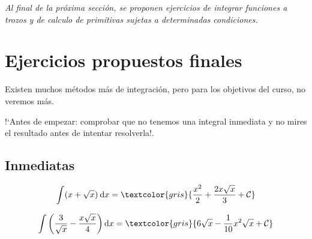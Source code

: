 {\emph{Al final de la próxima sección, se proponen ejercicios de integrar funciones a trozos y de calculo de primitivas sujetas a determinadas condiciones.}



\section{Ejercicios propuestos finales}

Existen muchos métodos más de integración, pero para los objetivos del curso, no veremos más.

!`Antes de empezar: comprobar que no tenemos una integral inmediata y no mires el resultado antes de intentar resolverla!. 

\leqnomode
\renewcommand{\theequation}{\arabic{equation}}
\setcounter{equation}{0}
\begin{fleqn}

\subsection*{Inmediatas}
	
	\begin{equation}
		\int (x+\sqrt {x})  \: \mathrm{d} x = \textcolor{gris}{\frac{x^2}{2} +\frac {2x\sqrt{x}}{3}+ \mathcal C}
	\end{equation}
	
	\begin{equation}
		\int \left( \frac {3}{\sqrt x} - \frac {x\sqrt x}{4} \right)\mathrm{d}x=\textcolor{gris}{6\sqrt x - \frac 1 {10} x^2 \sqrt x + \mathcal C}
	\end{equation}	


\end{fleqn}}
